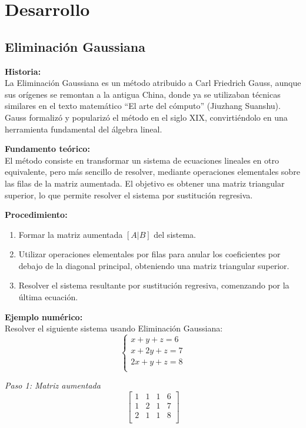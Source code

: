 \documentclass[12pt]{article}
\begin{document}
\section{Desarrollo}
\subsection{Eliminación Gaussiana}

\textbf{Historia:}  \\
La Eliminación Gaussiana es un método atribuido a Carl Friedrich Gauss, aunque sus orígenes se remontan a la antigua China, donde ya se utilizaban técnicas similares en el texto matemático “El arte del cómputo” (Jiuzhang Suanshu). Gauss formalizó y popularizó el método en el siglo XIX, convirtiéndolo en una herramienta fundamental del álgebra lineal.

\textbf{Fundamento teórico:}  \\
El método consiste en transformar un sistema de ecuaciones lineales en otro equivalente, pero más sencillo de resolver, mediante operaciones elementales sobre las filas de la matriz aumentada. El objetivo es obtener una matriz triangular superior, lo que permite resolver el sistema por sustitución regresiva.

\textbf{Procedimiento:}
\begin{enumerate}
    \item Formar la matriz aumentada $[A|B]$ del sistema.
    \item Utilizar operaciones elementales por filas para anular los coeficientes por debajo de la diagonal principal, obteniendo una matriz triangular superior.
    \item Resolver el sistema resultante por sustitución regresiva, comenzando por la última ecuación.
\end{enumerate}

\textbf{Ejemplo numérico:}  \\
Resolver el siguiente sistema usando Eliminación Gaussiana:
\[
\begin{cases}
x + y + z = 6 \\
x + 2y + z = 7 \\
2x + y + z = 8 \\
\end{cases}
\]

\textit{Paso 1: Matriz aumentada}
\[
\left[
\begin{array}{ccc|c}
1 & 1 & 1 & 6 \\
1 & 2 & 1 & 7 \\
2 & 1 & 1 & 8 \\
\end{array}
\right]
\]
\end{document}
